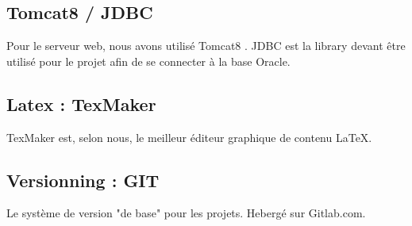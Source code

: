 \documentclass[a4paper,oneside,10pt]{article}
\begin{document}
\subsection{Tomcat8 / JDBC}

Pour le serveur web, nous avons utilisé Tomcat8 . 
JDBC est la library devant être utilisé pour le projet afin de se connecter à la base Oracle.  

\subsection{Latex : TexMaker}

TexMaker est, selon nous, le meilleur éditeur graphique de contenu \LaTeX. 

\subsection{Versionning : GIT}

Le système de version "de base" pour les projets. Hebergé sur Gitlab.com. 
\end{document}
